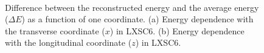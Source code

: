 \begin{figure}[!htb]
	\centering
			\\
	\caption{\label{fig.energyDep6} Difference between the reconstructed energy and the average energy ($\Delta E$) as a function of one coordinate. (a) Energy dependence with the transverse coordinate ($x$) in LXSC6. (b) Energy dependence with the longitudinal coordinate ($z$) in LXSC6.}
\end{figure}			


